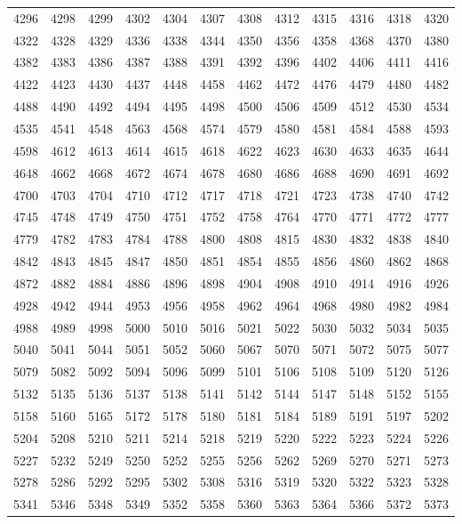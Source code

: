 \begin{center}
\begin{longtable}{llllllllllll}
4296 &4298 &4299 &4302 &4304 &4307 &4308 &4312 &4315 &4316 &4318 &4320 \\
4322 &4328 &4329 &4336 &4338 &4344 &4350 &4356 &4358 &4368 &4370 &4380 \\
4382 &4383 &4386 &4387 &4388 &4391 &4392 &4396 &4402 &4406 &4411 &4416 \\
4422 &4423 &4430 &4437 &4448 &4458 &4462 &4472 &4476 &4479 &4480 &4482 \\
4488 &4490 &4492 &4494 &4495 &4498 &4500 &4506 &4509 &4512 &4530 &4534 \\
4535 &4541 &4548 &4563 &4568 &4574 &4579 &4580 &4581 &4584 &4588 &4593 \\
4598 &4612 &4613 &4614 &4615 &4618 &4622 &4623 &4630 &4633 &4635 &4644 \\
4648 &4662 &4668 &4672 &4674 &4678 &4680 &4686 &4688 &4690 &4691 &4692 \\
4700 &4703 &4704 &4710 &4712 &4717 &4718 &4721 &4723 &4738 &4740 &4742 \\
4745 &4748 &4749 &4750 &4751 &4752 &4758 &4764 &4770 &4771 &4772 &4777 \\
4779 &4782 &4783 &4784 &4788 &4800 &4808 &4815 &4830 &4832 &4838 &4840 \\
4842 &4843 &4845 &4847 &4850 &4851 &4854 &4855 &4856 &4860 &4862 &4868 \\
4872 &4882 &4884 &4886 &4896 &4898 &4904 &4908 &4910 &4914 &4916 &4926 \\
4928 &4942 &4944 &4953 &4956 &4958 &4962 &4964 &4968 &4980 &4982 &4984 \\
4988 &4989 &4998 &5000 &5010 &5016 &5021 &5022 &5030 &5032 &5034 &5035 \\
5040 &5041 &5044 &5051 &5052 &5060 &5067 &5070 &5071 &5072 &5075 &5077 \\
5079 &5082 &5092 &5094 &5096 &5099 &5101 &5106 &5108 &5109 &5120 &5126 \\
5132 &5135 &5136 &5137 &5138 &5141 &5142 &5144 &5147 &5148 &5152 &5155 \\
5158 &5160 &5165 &5172 &5178 &5180 &5181 &5184 &5189 &5191 &5197 &5202 \\
5204 &5208 &5210 &5211 &5214 &5218 &5219 &5220 &5222 &5223 &5224 &5226 \\
5227 &5232 &5249 &5250 &5252 &5255 &5256 &5262 &5269 &5270 &5271 &5273 \\
5278 &5286 &5292 &5295 &5302 &5308 &5316 &5319 &5320 &5322 &5323 &5328 \\
5341 &5346 &5348 &5349 &5352 &5358 &5360 &5363 &5364 &5366 &5372 &5373 \\

\end{longtable}
\end{center}
